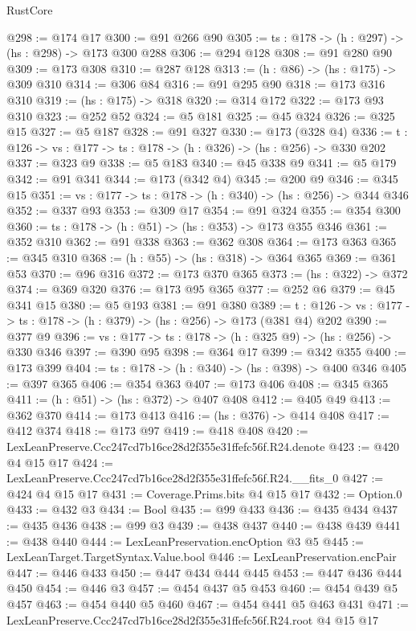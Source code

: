 \begin{lexlean}{RustCore}
\begin{coremodule}
@298 := @174 @17
@300 := @91 @266 @90
@305 := {ts : @178} -> (h : @297) -> (hs : @298) -> @173 @300 @288
@306 := @294 @128
@308 := @91 @280 @90
@309 := @173 @308
@310 := @287 @128
@313 := (h : @86) -> (hs : @175) -> @309 @310
@314 := @306 @84
@316 := @91 @295 @90
@318 := @173 @316 @310
@319 := (hs : @175) -> @318
@320 := @314 @172
@322 := @173 @93 @310
@323 := @252 @52
@324 := @5 @181
@325 := @45 @324
@326 := @325 @15
@327 := @5 @187
@328 := @91 @327
@330 := @173 (@328 @4)
@336 := {t : @126} -> {vs : @177} -> {ts : @178} -> (h : @326) -> (hs : @256) -> @330 @202
@337 := @323 @9
@338 := @5 @183
@340 := @45 @338 @9
@341 := @5 @179
@342 := @91 @341
@344 := @173 (@342 @4)
@345 := @200 @9
@346 := @345 @15
@351 := {vs : @177} -> {ts : @178} -> (h : @340) -> (hs : @256) -> @344 @346
@352 := @337 @93
@353 := @309 @17
@354 := @91 @324
@355 := @354 @300
@360 := {ts : @178} -> (h : @51) -> (hs : @353) -> @173 @355 @346
@361 := @352 @310
@362 := @91 @338
@363 := @362 @308
@364 := @173 @363
@365 := @345 @310
@368 := (h : @55) -> (hs : @318) -> @364 @365
@369 := @361 @53
@370 := @96 @316
@372 := @173 @370 @365
@373 := (hs : @322) -> @372
@374 := @369 @320
@376 := @173 @95 @365
@377 := @252 @6
@379 := @45 @341 @15
@380 := @5 @193
@381 := @91 @380
@389 := {t : @126} -> {vs : @177} -> {ts : @178} -> (h : @379) -> (hs : @256) -> @173 (@381 @4) @202
@390 := @377 @9
@396 := {vs : @177} -> {ts : @178} -> (h : @325 @9) -> (hs : @256) -> @330 @346
@397 := @390 @95
@398 := @364 @17
@399 := @342 @355
@400 := @173 @399
@404 := {ts : @178} -> (h : @340) -> (hs : @398) -> @400 @346
@405 := @397 @365
@406 := @354 @363
@407 := @173 @406
@408 := @345 @365
@411 := (h : @51) -> (hs : @372) -> @407 @408
@412 := @405 @49
@413 := @362 @370
@414 := @173 @413
@416 := (hs : @376) -> @414 @408
@417 := @412 @374
@418 := @173 @97
@419 := @418 @408
@420 := LexLeanPreserve.Ccc247cd7b16ce28d2f355e31ffefc56f.R24.denote
@423 := @420 @4 @15 @17
@424 := LexLeanPreserve.Ccc247cd7b16ce28d2f355e31ffefc56f.R24.__fits_0
@427 := @424 @4 @15 @17
@431 := Coverage.Prims.bits @4 @15 @17
@432 := Option.{0}
@433 := @432 @3
@434 := Bool
@435 := @99 @433
@436 := @435 @434
@437 := @435 @436
@438 := @99 @3
@439 := @438 @437
@440 := @438 @439
@441 := @438 @440
@444 := LexLeanPreservation.encOption @3 @5
@445 := LexLeanTarget.TargetSyntax.Value.bool
@446 := LexLeanPreservation.encPair
@447 := @446 @433
@450 := @447 @434 @444 @445
@453 := @447 @436 @444 @450
@454 := @446 @3
@457 := @454 @437 @5 @453
@460 := @454 @439 @5 @457
@463 := @454 @440 @5 @460
@467 := @454 @441 @5 @463 @431
@471 := LexLeanPreserve.Ccc247cd7b16ce28d2f355e31ffefc56f.R24.root @4 @15 @17

\end{coremodule}
\end{lexlean}
